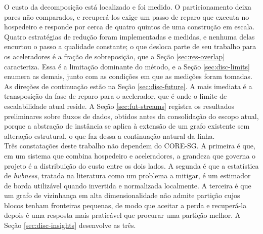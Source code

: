 O custo da decomposição está localizado e foi medido. O particionamento deixa pares não comparados, e recuperá-los exige um passo de reparo que executa no hospedeiro e responde por cerca de quatro quintos de uma construção em escala. Quatro estratégias de redução foram implementadas e medidas, e nenhuma delas encurtou o passo a qualidade constante; o que desloca parte de seu trabalho para os aceleradores é a fração de sobreposição, que a Seção \ref{sec:res-overlap} caracteriza. Essa é a limitação dominante do método, e a Seção \ref{sec:disc-limits} enumera as demais, junto com as condições em que as medições foram tomadas.\\

As direções de continuação estão na Seção \ref{sec:disc-future}. A mais imediata é a transposição da fase de reparo para o acelerador, que é onde o limite de escalabilidade atual reside. A Seção \ref{sec:fut-streams} registra os resultados preliminares sobre fluxos de dados, obtidos antes da consolidação do escopo atual, porque a abstração de instância se aplica à extensão de um grafo existente sem alteração estrutural, o que faz dessa a continuação natural da linha.\\

Três constatações deste trabalho não dependem do \ac{CORE-SG}. A primeira é que, em um sistema que combina hospedeiro e aceleradores, a grandeza que governa o projeto é a distribuição do custo entre os dois lados. A segunda é que a estatística de \textit{hubness}, tratada na literatura como um problema a mitigar, é um estimador de borda utilizável quando invertida e normalizada localmente. A terceira é que um grafo de vizinhança em alta dimensionalidade não admite partição cujos blocos tenham fronteiras pequenas, de modo que aceitar a perda e recuperá-la depois é uma resposta mais praticável que procurar uma partição melhor. A Seção \ref{sec:disc-insights} desenvolve as três.\\
